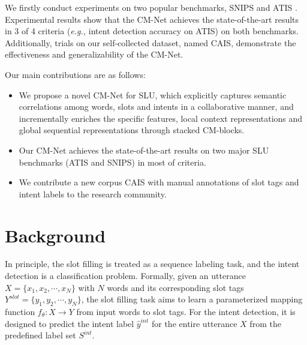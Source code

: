 \documentclass[11pt,a4paper]{article}
\begin{document}
We firstly conduct experiments on two popular benchmarks, SNIPS \cite{snips_2018} and ATIS \cite{atis_1990,atis_2010}. Experimental results show that the CM-Net achieves the state-of-the-art results in 3 of 4 criteria ({\em e.g.,} intent detection accuracy on ATIS) on both benchmarks. Additionally, trials on our self-collected dataset, named CAIS, demonstrate the effectiveness and generalizability of the CM-Net. 

Our main contributions are as follows:
\begin{itemize}
\item We propose a novel CM-Net for SLU, which explicitly captures semantic correlations among words, slots and intents in a collaborative manner, and incrementally enriches the specific features, local context representations and global sequential representations through stacked CM-blocks.
\item Our CM-Net achieves the state-of-the-art results on two major SLU benchmarks (ATIS and SNIPS) in most of criteria.
\item We contribute a new corpus CAIS with manual annotations of slot tags and intent labels to the research community.
\end{itemize}

\section{Background}
\label{background}
In principle, the slot filling is treated as a sequence labeling task, and the intent detection is a classification problem. Formally, given an utterance $X = \{x_1, x_2, \cdots, x_N \}$ with $N$ words and its corresponding slot tags $Y^{slot} = \{y_1, y_2, \cdots, y_N \}$,
the slot filling task aims to learn a parameterized mapping function $f_{\theta} : X \rightarrow Y $ from input words to slot tags. For the intent detection, it is designed to predict the intent label $\hat{y}^{int}$ for the entire utterance $X$ from the predefined label set $S^{int}$.
\end{document}
